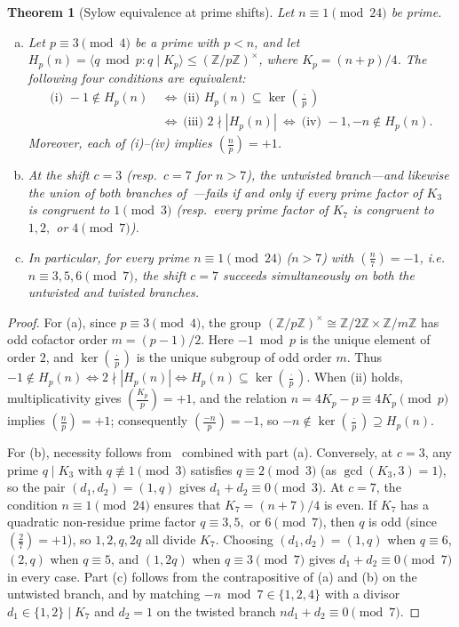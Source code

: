 \documentclass[11pt, a4paper]{article}
\theoremstyle{plain}
\newtheorem{theorem}{Theorem}[section]
\theoremstyle{definition}
\newcommand{\Z}{\mathbb{Z}}
\newcommand{\leg}[2]{\left(\frac{#1}{#2}\right)}
\begin{document}
\begin{theorem}[Sylow equivalence at prime shifts]\label{thm:sylow_and_c7_iff}
Let $n\equiv1\pmod{24}$ be prime.
\begin{enumerate}[(a)]
    \item Let $p\equiv3\pmod 4$ be a prime with $p<n$, and let $H_p(n)=\langle q\bmod p:q\mid K_p\rangle\le(\Z/p\Z)^{\times}$, where $K_p=(n+p)/4$. The following four conditions are equivalent:
    \[
    \begin{aligned}
    \text{(i) }-1\notin H_p(n)\ &\Longleftrightarrow\ \text{(ii) }H_p(n)\subseteq\ker\leg{\cdot}{p}\\
    &\Longleftrightarrow\ \text{(iii) }2\nmid|H_p(n)|\ \Longleftrightarrow\ \text{(iv) }-1,-n\notin H_p(n).
    \end{aligned}
    \]
    Moreover, each of (i)--(iv) implies $\leg{n}{p}=+1$.
    \item At the shift $c=3$ (resp.\ $c=7$ for $n>7$), the untwisted branch---and likewise the union of both branches of~\cite[Cor.~2.7]{dahan2026a}---fails if and only if every prime factor of $K_3$ is congruent to $1\pmod 3$ (resp.\ every prime factor of $K_7$ is congruent to $1,2,$ or $4\pmod 7$).
    \item In particular, for every prime $n\equiv1\pmod{24}$ ($n>7$) with $\leg{n}{7}=-1$, i.e.\ $n\equiv3,5,6\pmod 7$, the shift $c=7$ succeeds simultaneously on both the untwisted and twisted branches.
\end{enumerate}
\end{theorem}
\begin{proof}
For (a), since $p\equiv3\pmod 4$, the group $(\Z/p\Z)^{\times}\cong\Z/2\Z\times\Z/m\Z$ has odd cofactor order $m=(p-1)/2$. Here $-1\bmod p$ is the unique element of order $2$, and $\ker\leg{\cdot}{p}$ is the unique subgroup of odd order $m$. Thus $-1\notin H_p(n)\iff 2\nmid|H_p(n)|\iff H_p(n)\subseteq\ker\leg{\cdot}{p}$. When (ii) holds, multiplicativity gives $\leg{K_p}{p}=+1$, and the relation $n=4K_p-p\equiv 4K_p\pmod p$ implies $\leg{n}{p}=+1$; consequently $\leg{-n}{p}=-1$, so $-n\notin\ker\leg{\cdot}{p}\supseteq H_p(n)$.

For (b), necessity follows from~\cite[Thm.~4.6]{dahan2026a} combined with part (a). Conversely, at $c=3$, any prime $q\mid K_3$ with $q\not\equiv1\pmod 3$ satisfies $q\equiv2\pmod 3$ (as $\gcd(K_3,3)=1$), so the pair $(d_1,d_2)=(1,q)$ gives $d_1+d_2\equiv0\pmod 3$. At $c=7$, the condition $n\equiv1\pmod{24}$ ensures that $K_7=(n+7)/4$ is even. If $K_7$ has a quadratic non-residue prime factor $q\equiv3,5,$ or $6\pmod 7$, then $q$ is odd (since $\leg{2}{7}=+1$), so $1,2,q,2q$ all divide $K_7$. Choosing $(d_1,d_2)=(1,q)$ when $q\equiv6$, $(2,q)$ when $q\equiv5$, and $(1,2q)$ when $q\equiv3\pmod 7$ gives $d_1+d_2\equiv0\pmod 7$ in every case. Part (c) follows from the contrapositive of (a) and (b) on the untwisted branch, and by matching $-n\bmod 7\in\{1,2,4\}$ with a divisor $d_1\in\{1,2\}\mid K_7$ and $d_2=1$ on the twisted branch $nd_1+d_2\equiv0\pmod 7$.
\end{proof}
\end{document}
